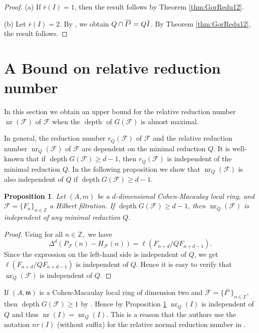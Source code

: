 \documentclass[12pt]{amsart}
\newtheorem{prop}[thm]{Proposition}
\theoremstyle{definition}
\theoremstyle{remark}
\numberwithin{equation}{section}
\newcommand{\bbZ}{\ensuremath{\mathbb Z}}
\newcommand{\m}{{\mathfrak m}}
\DeclareMathOperator{\depth}{depth}
\DeclareMathOperator{\nr}{{nr}}
\newcommand{\FF}{\mathcal{F}}
\newcommand{\ol}[1]{\mkern 1.5mu\overline{\mkern-1.5mu#1\mkern-1.5mu}\mkern 1.5mu} %
\begin{document}
\begin{proof}
(a) If $\overline{r}(I) =1$, then the result follows by Theorem \ref{thm:GorRedu12}. 
\par \noindent 
(b) Let $\overline{r}(I) = 2$. 
By \cite[Theorem 1]{It},  we obtain $Q \cap \ol{I^2} = Q\ol{I}$. 
By Theorem \ref{thm:GorRedu12}, the result follows.
\end{proof}

\section{A Bound on relative reduction number}
\label{sec:bound on rel red}
In this section we obtain an upper bound for 
the relative reduction number 
$\nr(\FF)$ of $\FF$ when the $\depth$ of $ G(\FF)$ is almost maximal. 


\par 
In general, the reduction number $r_Q(\FF)$ of $\FF$ 
and the relative reduction number $\nr_Q(\FF)$ of $\FF$ are 
dependent on the minimal reduction $Q$. 
It is well-known that if $\depth{G(\FF)} \geq d-1$, 
then $r_Q(\FF)$ is independent of the minimal reduction $Q$.
In the following proposition we show that $\nr_Q(\FF)$ is also 
independent of $Q$ if $\depth{G(\FF)} \geq d-1$. 


\begin{prop}\label{prop:relredind}
Let $(A, m)$ be a $d$-dimensional Cohen-Macaulay local ring, 
and $\mathcal{F}=\{F_n\}_{n\in \mathbb{Z}}$ a Hilbert filtration. 
If $\depth{G(\FF)} \geq d-1$, then $\nr_Q(\FF)$ is independent 
of any minimal reduction $Q$.
\end{prop}

\begin{proof}
Using \cite[Theorem 3.6]{Mar89} for all $n \in \mathbb{Z},$ we have
\[
\Delta^d(P_{\FF}(n) - H_{\FF}(n)) = \ell(F_{n+d}/QF_{n+d-1}).
\] 
Since the expression on the left-hand side is independent of $Q$, we get $\ell(F_{n+d}/QF_{n+d-1})$ is independent of $Q$. Hence it is easy to verify that $\nr_Q(\FF)$ is independent of $Q.$ 
\end{proof}

\par
If $(A,\m)$ is a Cohen-Macaulay local ring of dimension two and $\FF=\{\overline{I^n}\}_{n \in \bbZ},$ then $\depth G(\FF) \geq 1$ by \cite[Proposition 3.25]{Mar89}. Hence by Proposition \ref{prop:relredind} ${\nr}_Q(I) $ is independent of $Q$ and thus ${\nr}(I)= {\nr}_Q(I).$ This is a reason that the authors use the notation ${nr}(I)$ (without suffix) for the relative normal reduction number in \cite{ORWY2022}.
\end{document}
